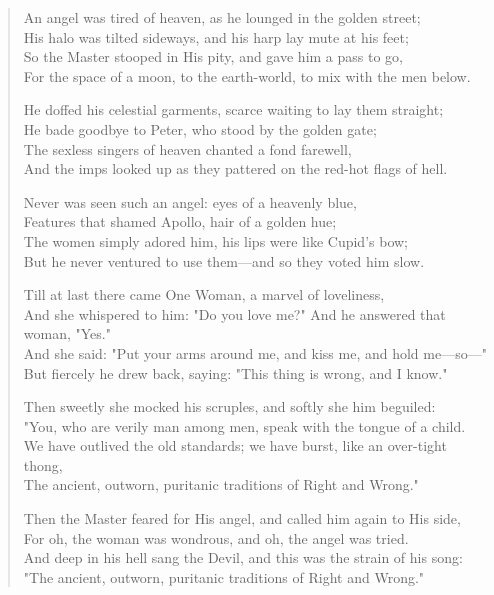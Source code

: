 

\begin{verse}
An angel was tired of heaven, as he lounged in the golden street;\\
His halo was tilted sideways, and his harp lay mute at his feet;\\
So the Master stooped in His pity, and gave him a pass to go,\\
For the space of a moon, to the earth-world, to mix with the men below.

He doffed his celestial garments, scarce waiting to lay them straight;\\
He bade goodbye to Peter, who stood by the golden gate;\\
The sexless singers of heaven chanted a fond farewell,\\
And the imps looked up as they pattered on the red-hot flags of hell.

Never was seen such an angel: eyes of a heavenly blue,\\
Features that shamed Apollo, hair of a golden hue;\\
The women simply adored him, his lips were like Cupid's bow;\\
But he never ventured to use them—and so they voted him slow.

Till at last there came One Woman, a marvel of loveliness,\\
And she whispered to him: "Do you love me?" And he answered that woman, "Yes."\\
And she said: "Put your arms around me, and kiss me, and hold me—so—"\\
But fiercely he drew back, saying: "This thing is wrong, and I know."

Then sweetly she mocked his scruples, and softly she him beguiled:\\
"You, who are verily man among men, speak with the tongue of a child.\\
We have outlived the old standards; we have burst, like an over-tight thong,\\
The ancient, outworn, puritanic traditions of Right and Wrong."

Then the Master feared for His angel, and called him again to His side,\\
For oh, the woman was wondrous, and oh, the angel was tried.\\
And deep in his hell sang the Devil, and this was the strain of his song:\\
"The ancient, outworn, puritanic traditions of Right and Wrong."

\end{verse}

